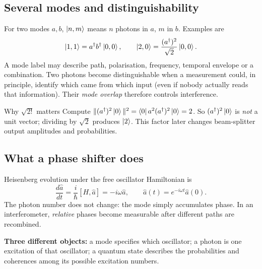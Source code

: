 \subsection{Several modes and distinguishability}
For two modes \(a,b\), \(\left\lvert n,m\right\rangle\)
means \(n\) photons in \(a\), \(m\) in \(b\).
Examples are
\[
\left\lvert 1,1\right\rangle=a^\dagger b^\dagger\left\lvert 0,0\right\rangle,
\qquad
\left\lvert 2,0\right\rangle=\frac{(a^\dagger)^2}{\sqrt2}\left\lvert 0,0\right\rangle.
\]
A mode label may describe path, polarisation,
frequency, temporal envelope or a combination.
Two photons become distinguishable when a measurement
could, in principle, identify which came from which
input (even if nobody actually reads that information).
Their \emph{mode overlap} therefore controls interference.

\begin{worked}{Why \(\sqrt{2!}\) matters}
Compute
\(\|(a^\dagger)^2\left\lvert 0\right\rangle\|^2
=\left\langle 0\right\rvert a^2(a^\dagger)^2\left\lvert 0\right\rangle=2\).
So \((a^\dagger)^2\left\lvert 0\right\rangle\) is \emph{not}
a unit vector; dividing by \(\sqrt2\)
produces \(\left\lvert 2\right\rangle\). This factor later changes
beam-splitter output amplitudes and probabilities.
\end{worked}
\subsection{What a phase shifter does}
Heisenberg evolution under the free oscillator Hamiltonian is
\[
\frac{d\hat a}{dt}=\frac{i}{\hbar}[H,\hat a]
=-i\omega\hat a,\qquad
\hat a(t)=e^{-i\omega t}\hat a(0).
\]
The photon number does not change: the mode
simply accumulates phase. In an interferometer,
\emph{relative} phases become measurable after
different paths are recombined.

\begin{checkpoint}
\textbf{Three different objects:} a mode specifies
which oscillator; a photon is one excitation
of that oscillator; a quantum state describes
the probabilities and coherences among its
possible excitation numbers.
\end{checkpoint}
